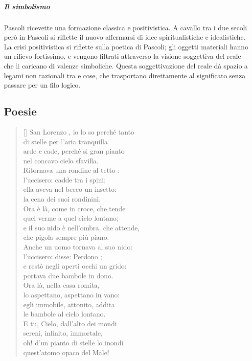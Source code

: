 \documentclass[10pt]{report}
\begin{document}
		\subparagraph[Simbolismo]{Il simbolismo}Pascoli ricevette una formazione classica e positivistica. A cavallo tra i due secoli però in Pascoli si riflette il nuovo affermarsi di idee spiritualistiche e idealistiche. La crisi positivistica si riflette sulla poetica di Pascoli; gli oggetti materiali hanno un rilievo fortissimo, e vengono filtrati attraverso la visione soggettiva del reale che li caricano di valenze simboliche. Questa soggettivazione del reale dà spazio a legami non razionali tra e cose, che trasportano direttamente al significato senza passare per un filo logico.

		\newpage
		\subsection[Poesie]{Poesie}
		
		
		\renewcommand{\poemtoc}{subsection}
		\settowidth{\versewidth}{There was an old party of Lyme}
		
		\begin{verse}[\versewidth]
			San Lorenzo , io lo so perché tanto\\
			di stelle per l'aria tranquilla\\
			arde e cade, perché si gran pianto\\
			nel concavo cielo sfavilla.\\
			
			
			Ritornava una rondine al tetto :\\
			l'uccisero: cadde tra i spini;\\
			ella aveva nel becco un insetto:\\
			la cena dei suoi rondinini.\\
			
			
			Ora è là, come in croce, che tende\\
			quel verme a quel cielo lontano;\\
			e il suo nido è nell'ombra, che attende,\\
			che pigola sempre più piano.\\
			
			
			Anche un uomo tornava al suo nido:\\
			l'uccisero: disse: Perdono ;\\
			e restò negli aperti occhi un grido: \\
			portava due bambole in dono.\\
			
			
			Ora là, nella casa romita,\\
			lo aspettano, aspettano in vano:\\
			egli immobile, attonito, addita\\
			le bambole al cielo lontano.\\
			
			
			E tu, Cielo, dall'alto dei mondi\\
			sereni, infinito, immortale,\\
			oh! d'un pianto di stelle lo inondi\\
			quest'atomo opaco del Male!\\
		\end{verse}
	
\end{document}
